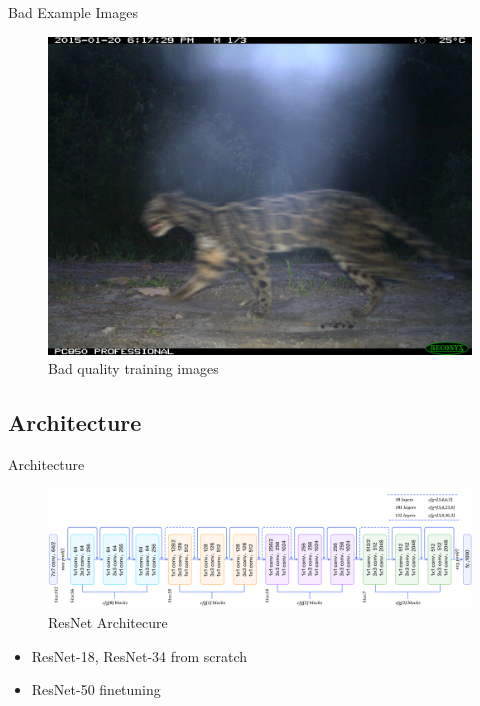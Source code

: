 \documentclass[10pt]{beamer}
\begin{document}
\begin{frame}{Bad Example Images}
\begin{minipage}[c]{0.48\linewidth}
\begin{figure}
			\includegraphics[width=\linewidth,height=\textheight,keepaspectratio]{images/example_bad_DFR_9_female.JPG}
			\caption{Bad quality training images}	
		\end{figure}
	\end{minipage}


\end{frame}

\subsection{Architecture}

\begin{frame}{Architecture}
	\begin{figure}
		\includegraphics[width=\columnwidth]{images/resnet.png}
		\caption{ResNet Architecure}
	\end{figure}

	\begin{itemize}
		\item ResNet-18, ResNet-34 from scratch
		\item ResNet-50 finetuning
	\end{itemize}
\end{frame}
\end{document}
